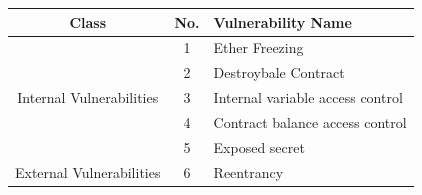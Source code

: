 \documentclass[a4paper,11pt]{article}
\begin{document}
\begin{table}[t]
        \begin{center}
            \small
            \begin{tabular}{||c|c|l||}
                \hline
                Class & No. & Vulnerability Name\\ 
                \hline
                \hline
                \multirow{5}{*}{Internal Vulnerabilities}                       & 1  & Ether Freezing \\ \cline{2-3}
                                                                                & 2 & Destroybale Contract  \\ \cline{2-3}
                                                                                & 3 & Internal variable access control  \\ \cline{2-3}
                                                                                & 4 & Contract balance access control  \\ \cline{2-3}
                                                                                & 5 & Exposed secret \\ \cline{1-3}
                \multirow{6}{*}{External Vulnerabilities}                       & 6 & Reentrancy \\ \cline{2-3}

\end{tabular}
\end{center}
\end{table}
\end{document}
